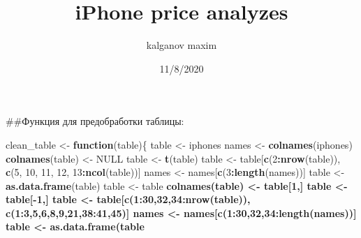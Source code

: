 \documentclass[
]{article}
\title{iPhone price analyzes}
\author{kalganov maxim}
\date{11/8/2020}
\newenvironment{Shaded}{\begin{snugshade}}{\end{snugshade}}
\newcommand{\CharTok}[1]{\textcolor[rgb]{0.31,0.60,0.02}{#1}}
\newcommand{\ControlFlowTok}[1]{\textcolor[rgb]{0.13,0.29,0.53}{\textbf{#1}}}
\newcommand{\DataTypeTok}[1]{\textcolor[rgb]{0.13,0.29,0.53}{#1}}
\newcommand{\DecValTok}[1]{\textcolor[rgb]{0.00,0.00,0.81}{#1}}
\newcommand{\KeywordTok}[1]{\textcolor[rgb]{0.13,0.29,0.53}{\textbf{#1}}}
\newcommand{\NormalTok}[1]{#1}
\newcommand{\OperatorTok}[1]{\textcolor[rgb]{0.81,0.36,0.00}{\textbf{#1}}}
\newcommand{\OtherTok}[1]{\textcolor[rgb]{0.56,0.35,0.01}{#1}}
\newcommand{\StringTok}[1]{\textcolor[rgb]{0.31,0.60,0.02}{#1}}
\begin{document}
\maketitle

\#\#Функция для предобработки таблицы:

\begin{Shaded}
\begin{Highlighting}[]
\NormalTok{clean_table <-}\StringTok{ }\ControlFlowTok{function}\NormalTok{(table)\{}
\NormalTok{  table <-}\StringTok{ }\NormalTok{iphones}
\NormalTok{  names <-}\StringTok{ }\KeywordTok{colnames}\NormalTok{(iphones)}
  \KeywordTok{colnames}\NormalTok{(table) <-}\StringTok{ }\OtherTok{NULL}
\NormalTok{  table <-}\StringTok{ }\KeywordTok{t}\NormalTok{(table)}
\NormalTok{  table <-}\StringTok{ }\NormalTok{table[}\KeywordTok{c}\NormalTok{(}\DecValTok{2}\OperatorTok{:}\KeywordTok{nrow}\NormalTok{(table)), }\KeywordTok{c}\NormalTok{(}\DecValTok{5}\NormalTok{, }\DecValTok{10}\NormalTok{, }\DecValTok{11}\NormalTok{, }\DecValTok{12}\NormalTok{, }\DecValTok{13}\OperatorTok{:}\KeywordTok{ncol}\NormalTok{(table))]}
\NormalTok{  names <-}\StringTok{ }\NormalTok{names[}\KeywordTok{c}\NormalTok{(}\DecValTok{3}\OperatorTok{:}\KeywordTok{length}\NormalTok{(names))]}
\NormalTok{  table <-}\StringTok{ }\KeywordTok{as.data.frame}\NormalTok{(table)}
\NormalTok{  table <-}\StringTok{ }\NormalTok{table }\OperatorTok{%>%}\StringTok{ }\KeywordTok{mutate}\NormalTok{(}\KeywordTok{across}\NormalTok{(}\KeywordTok{where}\NormalTok{(is.factor), as.character))}
  \KeywordTok{colnames}\NormalTok{(table) <-}\StringTok{ }\NormalTok{table[}\DecValTok{1}\NormalTok{,]}
\NormalTok{  table <-}\StringTok{ }\NormalTok{table[}\OperatorTok{-}\DecValTok{1}\NormalTok{,]}
\NormalTok{  table <-}\StringTok{ }\NormalTok{table[}\KeywordTok{c}\NormalTok{(}\DecValTok{1}\OperatorTok{:}\DecValTok{30}\NormalTok{,}\DecValTok{32}\NormalTok{,}\DecValTok{34}\OperatorTok{:}\KeywordTok{nrow}\NormalTok{(table)), }\KeywordTok{c}\NormalTok{(}\DecValTok{1}\OperatorTok{:}\DecValTok{3}\NormalTok{,}\DecValTok{5}\NormalTok{,}\DecValTok{6}\NormalTok{,}\DecValTok{8}\NormalTok{,}\DecValTok{9}\NormalTok{,}\DecValTok{21}\NormalTok{,}\DecValTok{38}\OperatorTok{:}\DecValTok{41}\NormalTok{,}\DecValTok{45}\NormalTok{)]}
\NormalTok{  names <-}\StringTok{ }\NormalTok{names[}\KeywordTok{c}\NormalTok{(}\DecValTok{1}\OperatorTok{:}\DecValTok{30}\NormalTok{,}\DecValTok{32}\NormalTok{,}\DecValTok{34}\OperatorTok{:}\KeywordTok{length}\NormalTok{(names))]}
\NormalTok{  table <-}\StringTok{ }\KeywordTok{as.data.frame}\NormalTok{(table }\OperatorTok{%>%}\StringTok{ }\KeywordTok{lapply}\NormalTok{(}\ControlFlowTok{function}\NormalTok{(x) }\KeywordTok{type.convert}\NormalTok{(}\KeywordTok{str_extract}\NormalTok{(x, }\StringTok{"(}\CharTok{\textbackslash{}\textbackslash{}}\StringTok{d)+(.}\CharTok{\textbackslash{}\textbackslash{}}\StringTok{d)\{0,\}"}\NormalTok{), }\DataTypeTok{as.is =} \OtherTok{TRUE}\NormalTok{)))}
}}
\end{Highlighting}
\end{Shaded}
\end{document}

